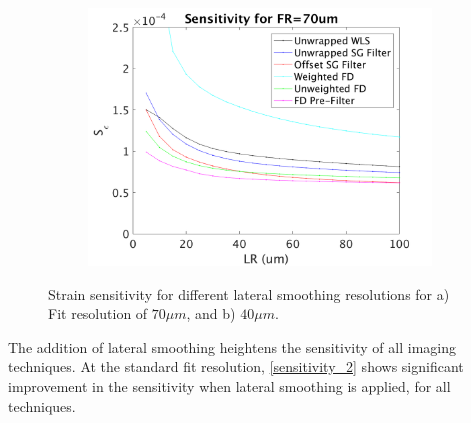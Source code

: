 \begin{figure}
	\centering
    \begin{subfigure}{0.49\textwidth}
    	\centering
        \includegraphics[width=\textwidth]{figures/sensitivity_FR70.png}
    \end{subfigure}
    \begin{subfigure}{0.49\textwidth}
    	\centering
    \end{subfigure}
    \label{sensitivity_2}
    \caption{Strain sensitivity for different lateral smoothing resolutions for a) Fit resolution of $70\mu m$, and b) $40\mu m$.}
\end{figure}

The addition of lateral smoothing heightens the sensitivity of all imaging techniques. At the standard fit resolution, \autoref{sensitivity_2} shows significant improvement in the sensitivity when lateral smoothing is applied, for all techniques.

